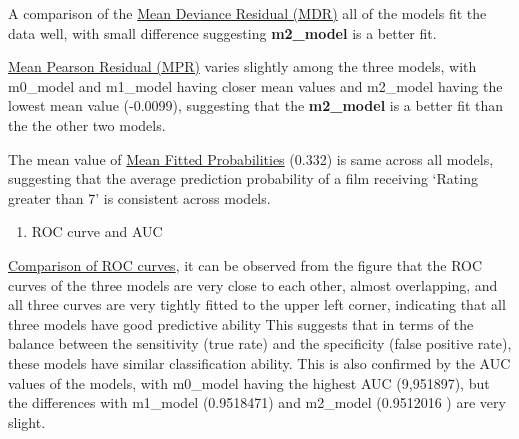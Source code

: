 \documentclass[
  letterpaper,
  DIV=11,
  numbers=noendperiod]{scrartcl}
\providecommand{\tightlist}{%
  \setlength{\itemsep}{0pt}\setlength{\parskip}{0pt}}\usepackage{longtable,booktabs,array}
\begin{document}
A comparison of the \ul{Mean Deviance Residual (MDR)} all of the models
fit the data well, with small difference suggesting \textbf{m2\_model}
is a better fit.

\ul{Mean Pearson Residual (MPR)} varies slightly among the three models,
with m0\_model and m1\_model having closer mean values and m2\_model
having the lowest mean value (-0.0099), suggesting that the
\textbf{m2\_model} is a better fit than the the other two models.

The mean value of \ul{Mean Fitted Probabilities} (0.332) is same across
all models, suggesting that the average prediction probability of a film
receiving `Rating greater than 7' is consistent across models.\clearpage

\begin{enumerate}
\def\labelenumi{\arabic{enumi}.}
\setcounter{enumi}{2}
\tightlist
\item
  ROC curve and AUC
\end{enumerate}

\ul{Comparison of ROC curves}, it can be observed from the figure that
the ROC curves of the three models are very close to each other, almost
overlapping, and all three curves are very tightly fitted to the upper
left corner, indicating that all three models have good predictive
ability This suggests that in terms of the balance between the
sensitivity (true rate) and the specificity (false positive rate), these
models have similar classification ability. This is also confirmed by
the AUC values of the models, with m0\_model having the highest AUC
(9,951897), but the differences with m1\_model (0.9518471) and m2\_model
(0.9512016 ) are very slight.
\end{document}
